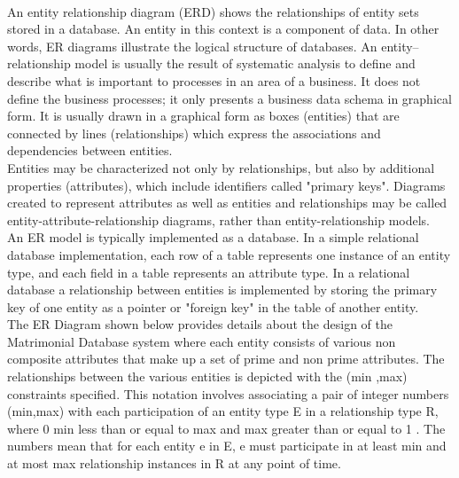 \documentclass[12pt]{report}
\begin{document}
\paragraph{}
An entity relationship diagram (ERD) shows the relationships of entity sets stored in a database. An entity in this context is a component of data. In other words, ER diagrams illustrate the logical structure of databases. An entity–relationship model is usually the result of systematic analysis to define and describe what is important to processes in an area of a business. It does not define the business processes; it only presents a business data schema in graphical form. It is usually drawn in a graphical form as boxes (entities) that are connected by lines (relationships) which express the associations and dependencies between entities. \\
 
Entities may be characterized not only by relationships, but also by additional properties (attributes), which include identifiers called "primary keys". Diagrams created to represent attributes as well as entities and relationships may be called entity-attribute-relationship diagrams, rather than entity-relationship models.\\
 
An ER model is typically implemented as a database. In a simple relational database implementation, each row of a table represents one instance of an entity type, and each field in a table represents an attribute type. In a relational database a relationship between entities is implemented by storing the primary key of one entity as a pointer or "foreign key" in the table of another entity.\\

The ER Diagram shown below provides details about the design of the Matrimonial Database system where each entity consists of various non composite attributes that make up a set of prime and non prime attributes. The relationships between the various entities is depicted with the (min ,max) constraints specified. This notation involves associating a pair of integer numbers (min,max) with each participation of an entity type E in a relationship type R, where 0 min less than or equal to max and max greater than or equal to 1 . The numbers mean that for each entity e in E, e must participate in at least min and at most max relationship instances in R at any point of time.  
\end{document}

